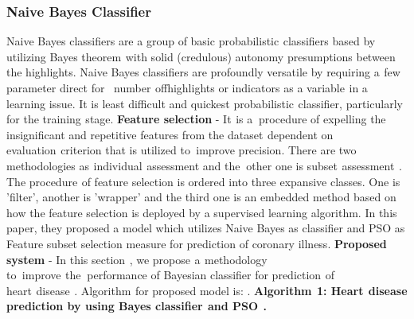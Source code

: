 \documentclass[oneside,12pt]{Classes/VTU}
\begin{document}
    \subsubsection{Naive Bayes Classifier}
    Naive Bayes classifiers are a group of basic probabilistic\tiny\textcolor{white}{s}\normalsize classifiers based by utilizing Bayes theorem\tiny\textcolor{white}{s}\normalsize with solid (credulous) autonomy presumptions between the highlights. Naive Bayes classifiers are profoundly versatile by requiring a\tiny\textcolor{white}{s}\normalsize few parameter direct for\tiny\textcolor{white}{m}\normalsize number\tiny\textcolor{white}{s}\normalsize of\tiny\textcolor{white}{f}\normalsize highlights or indicators as a variable\tiny\textcolor{white}{s}\normalsize in a learning issue. It is least difficult and quickest probabilistic\tiny\textcolor{white}{s}\normalsize classifier, particularly for the training\tiny\textcolor{white}{s}\normalsize stage.    
    \linebreak
    \linebreak                
    \textbf{Feature selection} - It\tiny\textcolor{white}{s}\normalsize is a\tiny\textcolor{white}{n}\normalsize procedure of expelling the insignificant and repetitive features from the dataset\tiny\textcolor{white}{s}\normalsize dependent on evaluation\tiny\textcolor{white}{s}\normalsize criterion that is utilized to\tiny\textcolor{white}{o}\normalsize improve precision. There are two methodologies as\tiny\textcolor{white}{s}\normalsize individual\tiny\textcolor{white}{s}\normalsize assessment and the\tiny\textcolor{white}{n}\normalsize other one is subset\tiny\textcolor{white}{s}\normalsize assessment\tiny\textcolor{white}{s}\normalsize. The procedure\tiny\textcolor{white}{s}\normalsize of feature selection is ordered into three expansive classes. One is 'filter', another is 'wrapper' and the third one is an embedded method based on how the feature selection is deployed by a supervised learning algorithm. In this paper, they proposed a model which utilizes Naive Bayes as classifier and PSO as Feature subset selection measure for prediction of coronary illness.
    \linebreak
    \linebreak                
    \textbf{Proposed system} - In this section\tiny\textcolor{white}{s}\normalsize, we propose\tiny\textcolor{white}{s}\normalsize a\tiny\textcolor{white}{s}\normalsize methodology to\tiny\textcolor{white}{o}\normalsize improve\tiny\textcolor{white}{s}\normalsize the\tiny\textcolor{white}{n}\normalsize performance of Bayesian classifier for prediction\tiny\textcolor{white}{s}\normalsize of heart\tiny\textcolor{white}{s}\normalsize disease\tiny\textcolor{white}{s}\normalsize. Algorithm\tiny\textcolor{white}{s}\normalsize for proposed model is:                    .
    \linebreak
    \linebreak
    \textbf{Algorithm\tiny\textcolor{white}{s}\normalsize 1: Heart\tiny\textcolor{white}{s}\normalsize disease prediction by using Bayes classifier\tiny\textcolor{white}{s}\normalsize and PSO\tiny\textcolor{white}{s}\normalsize.}
    
\end{document}
